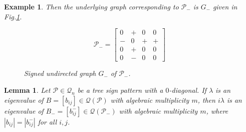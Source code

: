 \documentclass[10pt,a4paper]{amsart}
\newtheorem{lemma}{Lemma}[section]
\newtheorem{eg}{Example}[section]
\numberwithin{equation}{section}
\begin{document}
\begin{eg}
		Then the underlying graph corresponding to $\mathcal{P}_-$ is $G_-$ given in Fig.\ref{fign2}.
		\begin{figure}[H]
			\centering
			\begin{minipage}{0.45\textwidth}
				\vspace{-1cm}
				\[
				\mathcal{P}_-=
				\begin{bmatrix}
					0 & + & 0 & 0 \\
					- & 0 & + & + \\
					0 & + & 0 & 0 \\
					0 & - & 0 & 0
				\end{bmatrix}
				\]
			\end{minipage}\hfill
			\begin{minipage}{0.45\textwidth}
				\centering
				\caption{Signed undirected graph $G_-$ of $\mathcal{P}_-$.}
				\label{fign2}
			\end{minipage}
		\end{figure}
		
	\end{eg}
	\begin{lemma} \label{3.1} Let $\mathcal{P}\in \mathcal{Q}_n$ be a tree sign pattern with a $0$-diagonal.
		If $\lambda$ is an eigenvalue of $B=[b_{ij}]\in \mathcal{Q}(\mathcal{P})$ with algebraic multiplicity $m$, then $i\lambda$ is an eigenvalue of $B_-=[b^-_{ij}] \in \mathcal{Q}(\mathcal{P}_-)$ with algebraic multiplicity $m$, where $|b_{ij}|=|b^-_{ij}|$ for all $i,j$.
	\end{lemma}
\end{document}
